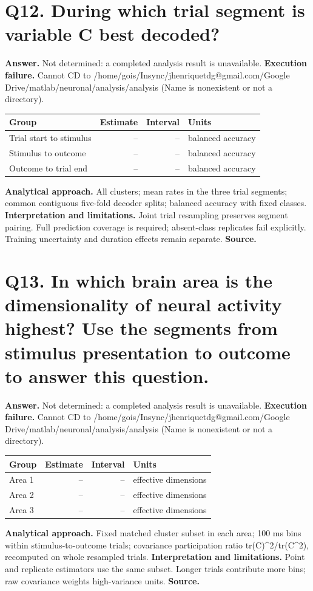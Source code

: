 \documentclass[11pt,a4paper]{article}
\begin{document}
\section*{Q12. During which trial segment is variable C best decoded?}
\textbf{Answer.} Not determined: a completed analysis result is unavailable.
\textbf{Execution failure.} Cannot CD to /home/gois/Insync/jhenriquetdg@gmail.com/Google Drive/matlab/neuronal/analysis/analysis (Name is nonexistent or not a directory).
\begin{tabularx}{\linewidth}{XrrX}\toprule Group & Estimate & Interval & Units \\\midrule
Trial start to stimulus & -- & -- & balanced accuracy \\
Stimulus to outcome & -- & -- & balanced accuracy \\
Outcome to trial end & -- & -- & balanced accuracy \\
\bottomrule\end{tabularx}
\textbf{Analytical approach.} All clusters; mean rates in the three trial segments; common contiguous five-fold decoder splits; balanced accuracy with fixed classes.
\textbf{Interpretation and limitations.} Joint trial resampling preserves segment pairing. Full prediction coverage is required; absent-class replicates fail explicitly. Training uncertainty and duration effects remain separate.
\textbf{Source.} 
\clearpage
\section*{Q13. In which brain area is the dimensionality of neural activity highest? Use the segments from stimulus presentation to outcome to answer this question.}
\textbf{Answer.} Not determined: a completed analysis result is unavailable.
\textbf{Execution failure.} Cannot CD to /home/gois/Insync/jhenriquetdg@gmail.com/Google Drive/matlab/neuronal/analysis/analysis (Name is nonexistent or not a directory).
\begin{tabularx}{\linewidth}{XrrX}\toprule Group & Estimate & Interval & Units \\\midrule
Area 1 & -- & -- & effective dimensions \\
Area 2 & -- & -- & effective dimensions \\
Area 3 & -- & -- & effective dimensions \\
\bottomrule\end{tabularx}
\textbf{Analytical approach.} Fixed matched cluster subset in each area; 100 ms bins within stimulus-to-outcome trials; covariance participation ratio tr(C)\textasciicircum{}2/tr(C\textasciicircum{}2), recomputed on whole resampled trials.
\textbf{Interpretation and limitations.} Point and replicate estimators use the same subset. Longer trials contribute more bins; raw covariance weights high-variance units.
\textbf{Source.} 
\clearpage
\end{document}
